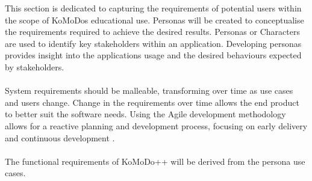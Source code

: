 \graphicspath{ {images/requirements/} }

This section is dedicated to capturing the requirements of potential users within the scope of KoMoDos educational use. Personas will be created to conceptualise the requirements required to achieve the desired results. Personas or Characters are used to identify key stakeholders within an application. Developing personas provides insight into the applications usage and the desired behaviours expected by stakeholders.\\\\
%
System requirements should be malleable, transforming over time as use cases and users change. Change in the requirements over time allows the end product to better suit the software needs. Using the Agile development methodology allows for a reactive planning and development process, focusing on early delivery and continuous development \cite{wikipedia_agile_dev}.\\\\
%
The functional requirements of KoMoDo++ will be derived from the persona use cases.

